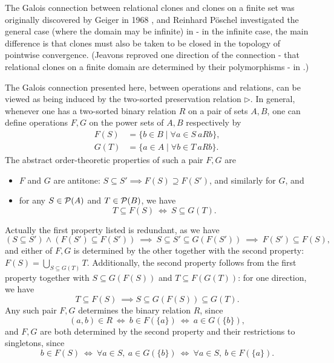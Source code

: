 \documentclass[letterpaper,11pt]{article}
\begin{document}
\begin{rem} The Galois connection between relational clones and clones on a finite set was originally discovered by Geiger in 1968 \cite{geiger-galois}, and Reinhard P\"oschel investigated the general case (where the domain may be infinite) in \cite{poschel-galois} - in the infinite case, the main difference is that clones must also be taken to be closed in the topology of pointwise convergence. (Jeavons reproved one direction of the connection - that relational clones on a finite domain are determined by their polymorphisms - in \cite{jeavons}.)
\end{rem}

\begin{rem} The Galois connection presented here, between operations and relations, can be viewed as being induced by the two-sorted preservation relation $\rhd$. In general, whenever one has a two-sorted binary relation $R$ on a pair of sets $A, B$, one can define operations $F,G$ on the power sets of $A, B$ respectively by
\begin{align*}
F(S) &= \{b \in B \mid \forall a \in S\ aRb\},\\
G(T) &= \{a \in A \mid \forall b \in T\ aRb\}.
\end{align*}
The abstract order-theoretic properties of such a pair $F,G$ are
\begin{itemize}
\item $F$ and $G$ are antitone: $S \subseteq S' \implies F(S) \supseteq F(S')$, and similarly for $G$, and

\item for any $S \in \mathcal{P}(A)$ and $T \in \mathcal{P}(B)$, we have
\[
T \subseteq F(S)\ \iff\ S \subseteq G(T).
\]
\end{itemize}
Actually the first property listed is redundant, as we have
\[
(S\subseteq S') \wedge (F(S') \subseteq F(S'))\ \implies\ S \subseteq S' \subseteq G(F(S'))\ \implies\ F(S') \subseteq F(S),
\]
and either of $F,G$ is determined by the other together with the second property: $F(S) = \bigcup_{S \subseteq G(T)} T$. Additionally, the second property follows from the first property together with $S \subseteq G(F(S))$ and $T \subseteq F(G(T))$: for one direction, we have
\[
T \subseteq F(S)\ \implies S \subseteq G(F(S)) \subseteq G(T).
\]
Any such pair $F,G$ determines the binary relation $R$, since
\[
(a,b) \in R\ \iff\ b \in F(\{a\})\ \iff\ a \in G(\{b\}),
\]
and $F,G$ are both determined by the second property and their restrictions to singletons, since
\[
b \in F(S)\ \iff\ \forall a \in S,\ a \in G(\{b\})\ \iff\ \forall a \in S,\ b \in F(\{a\}).
\]


\end{rem}
\end{document}

